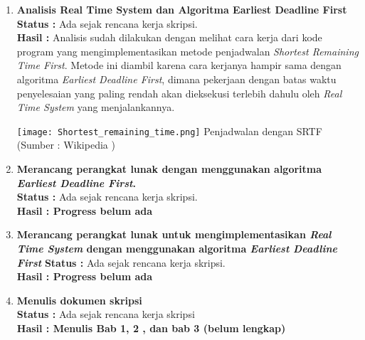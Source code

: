 \documentclass[a4paper,twoside]{article}
\begin{document}
\begin{enumerate}
		(d) Algoritma {\it Earliest Deadline First}\newline
		{\it Earliest Deadline First} adalah algoritma penjadwalan dinamis yang digunakan pada {\it Real Time System} untuk menempatkan proses dalam sebuah {\it Priority Queue}. Apabila ada penjadwalan baru yang muncul, maka {\it Queue} akan mencari proses dengan tenggat waktu ({\it Deadline}) paling dekat untuk selanjutnya akan dieksekusi terlebih dahulu. \newline
		EDF memiliki algoritma penjadwalan yang optimal pada {\it uniprocessor preemptive}, dalam artian jika terdapat kumpulan pekerjaan independen, yang masing-masing mempunyai {\it Arrival Time dan Tenggat Waktu}, maka EDF akan menjadwalkannya agar mereka dapat diselesaikan sesuai dengan Tenggat Waktu mereka.\newline
		Logika dari EDF dapat dilihat pada sumber kode berikut :
		
		\item \textbf{Analisis Real Time System dan Algoritma Earliest Deadline First}\\
		{\bf Status :} Ada sejak rencana kerja skripsi.\\
		{\bf Hasil : }\newline
		Analisis sudah dilakukan dengan melihat cara kerja dari kode program yang mengimplementasikan metode penjadwalan {\it Shortest Remaining Time First}. Metode ini diambil karena cara kerjanya hampir sama dengan algoritma {\it Earliest Deadline First}, dimana pekerjaan dengan batas waktu penyelesaian yang paling rendah akan dieksekusi terlebih dahulu oleh {\it Real Time System} yang menjalankannya. 
		\begin{center}
		\texttt{[image: Shortest\_remaining\_time.png]}\newline
		Penjadwalan dengan SRTF (Sumber : Wikipedia )
		\end{center}
		\item \textbf{Merancang perangkat lunak dengan menggunakan algoritma {\it Earliest Deadline First}.}\\
		{\bf Status :} Ada sejak rencana kerja skripsi.\\
		{\bf Hasil : Progress belum ada} 
		
		\item \textbf{Merancang perangkat lunak untuk mengimplementasikan {\it Real Time System} dengan menggunakan algoritma {\it Earliest Deadline First}}
		{\bf Status :} Ada sejak rencana kerja skripsi.\\
		{\bf Hasil : Progress belum ada} 
		
		\item \textbf{Menulis dokumen skripsi}\\
		{\bf Status :} Ada sejak rencana kerja skripsi\\
		{\bf Hasil : Menulis Bab 1, 2 , dan bab 3 (belum lengkap)} 
		

	\end{enumerate}
\end{document}
